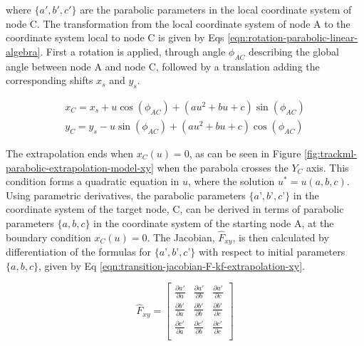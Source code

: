where $\{a', b', c' \}$ are the parabolic parameters in the local coordinate system of node C. The transformation from the local coordinate system of node A to the coordinate system local to node C is given by Eqs \eqref{eqn:rotation-parabolic-linear-algebra}. First a rotation is applied, through angle $\phi_{AC}$ describing the global angle between node A and node C, followed by a translation adding the corresponding shifts $x_s$ and $y_s$.

\begin{equation}
\begin{aligned}
x_C = x_s + u\cos(\phi_{AC}) + (au^2 + bu + c)\sin(\phi_{AC}) \\
y_C = y_s - u\sin(\phi_{AC}) + (au^2 + bu + c)\cos(\phi_{AC})
\end{aligned}
\label{eqn:rotation-parabolic-linear-algebra}
\end{equation}


The extrapolation ends when $x_{C}(u) = 0$, as can be seen in Figure \ref{fig:trackml-parabolic-extrapolation-model-xy} when the parabola crosses the $Y_C$ axis. This condition forms a quadratic equation in $u$, where the solution $u^{*} = u(a, b, c)$. Using parametric derivatives, the parabolic parameters $\{a’, b’, c’ \}$ in the coordinate system of the target node, C, can be derived in terms of parabolic parameters $\{a, b, c \}$ in the coordinate system of the starting node A, at the boundary condition $x_{C}(u) = 0$. The Jacobian, $\hat{F}_{xy}$, is then calculated by differentiation of the formulas for $\{a’, b’, c’ \}$ with respect to initial parameters $\{a, b, c \}$, given by Eq \eqref{eqn:transition-jacobian-F-kf-extrapolation-xy}.  



\begin{equation}
\hat{F}_{xy} = \begin{bmatrix} 
        \frac{\partial a'}{\partial a} & \frac{\partial a'}{\partial b} & \frac{\partial a'}{\partial c} \\ 
        
        \frac{\partial b'}{\partial a} & \frac{\partial b'}{\partial b} & \frac{\partial b'}{\partial c} \\
        
        \frac{\partial c'}{\partial a} & \frac{\partial c'}{\partial b} & \frac{\partial c'}{\partial c} \\
        \end{bmatrix} 
\label{eqn:transition-jacobian-F-kf-extrapolation-xy}
\end{equation}


